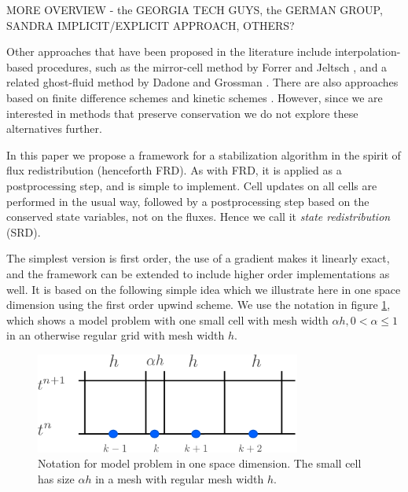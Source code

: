 MORE OVERVIEW - the GEORGIA TECH
GUYS, the GERMAN GROUP, SANDRA IMPLICIT/EXPLICIT APPROACH, OTHERS?

Other approaches that have been proposed in the literature include
interpolation-based procedures, such as the mirror-cell method by Forrer
and Jeltsch \cite{article:FoJe98}, and a related ghost-fluid method by
Dadone and Grossman \cite{DadoneGrossman}.
There are also approaches based on finite difference schemes
\cite{SjogreenPetersson,MarcoBjorn}
and kinetic schemes \cite{Oksuzoglu:thesis,KeenKarni}.
However, since we are interested in methods
that preserve conservation we do not explore these alternatives further.

In this paper we propose a framework for a stabilization algorithm in
the spirit of flux redistribution (henceforth FRD). 
As with FRD, it is applied as a postprocessing
step, and is simple to implement. Cell updates on all cells are performed
in the usual way, followed by a postprocessing step based on the
conserved state variables, not on the fluxes.
Hence we call it {\em state redistribution} (SRD).

The simplest version is first order,
the use of a gradient makes it linearly exact, and the framework can be
extended to include higher order implementations as well. 
It is based on the following simple idea which we illustrate
here in one space dimension using the  first order upwind scheme.
We use the notation in  figure \ref{fig:modelProblem1}, which shows a
model problem with one
small cell with mesh width  $\alpha h, 0 < \alpha \leq 1$ in an
otherwise regular grid with mesh width $h$.

\begin{figure}
\begin{center}
\includegraphics[height=1.3in]{figs/1dfig.pdf}
\caption{\sf Notation for model problem in one space dimension. The small
cell has size $\alpha h$ in a mesh with regular mesh width $h$.}
\label{fig:modelProblem1}
\end{center}
\end{figure}

